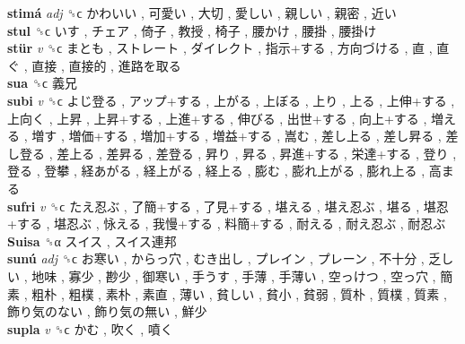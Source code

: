 \textbf{stimá} \emph{adj}  ␝ϲ   かわいい ,  可愛い ,  大切 ,  愛しい ,  親しい ,  親密 ,  近い   \\
\textbf{stul} ␝ϲ   いす ,  チェア ,  倚子 ,  教授 ,  椅子 ,  腰かけ ,  腰掛 ,  腰掛け   \\
\textbf{stür} \emph{v}  ␝ϲ   まとも ,  ストレート ,  ダイレクト ,  指示+する ,  方向づける ,  直 ,  直ぐ ,  直接 ,  直接的 ,  進路を取る   \\
\textbf{sua} ␝ϲ   義兄   \\
\textbf{subi} \emph{v}  ␝ϲ   よじ登る ,  アップ+する ,  上がる ,  上ぼる ,  上り ,  上る ,  上伸+する ,  上向く ,  上昇 ,  上昇+する ,  上進+する ,  伸びる ,  出世+する ,  向上+する ,  増える ,  増す ,  増価+する ,  増加+する ,  増益+する ,  嵩む ,  差し上る ,  差し昇る ,  差し登る ,  差上る ,  差昇る ,  差登る ,  昇り ,  昇る ,  昇進+する ,  栄達+する ,  登り ,  登る ,  登攀 ,  経あがる ,  経上がる ,  経上る ,  膨む ,  膨れ上がる ,  膨れ上る ,  高まる   \\
\textbf{sufri} \emph{v}  ␝ϲ   たえ忍ぶ ,  了簡+する ,  了見+する ,  堪える ,  堪え忍ぶ ,  堪る ,  堪忍+する ,  堪忍ぶ ,  怺える ,  我慢+する ,  料簡+する ,  耐える ,  耐え忍ぶ ,  耐忍ぶ   \\
\textbf{Suisa} ␝α   スイス ,  スイス連邦   \\
\textbf{sunú} \emph{adj}  ␝ϲ   お寒い ,  からっ穴 ,  むき出し ,  プレイン ,  プレーン ,  不十分 ,  乏しい ,  地味 ,  寡少 ,  尠少 ,  御寒い ,  手うす ,  手薄 ,  手薄い ,  空っけつ ,  空っ穴 ,  簡素 ,  粗朴 ,  粗樸 ,  素朴 ,  素直 ,  薄い ,  貧しい ,  貧小 ,  貧弱 ,  質朴 ,  質樸 ,  質素 ,  飾り気のない ,  飾り気の無い ,  鮮少   \\
\textbf{supla} \emph{v}  ␝ϲ   かむ ,  吹く ,  噴く   \\
